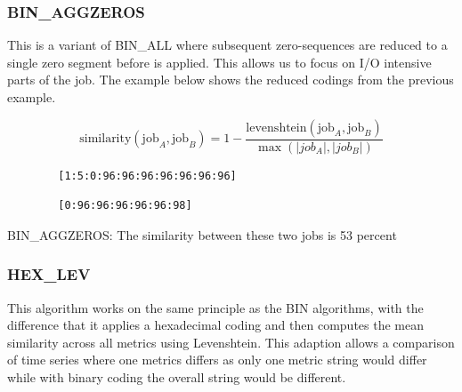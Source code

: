 \documentclass{jhps}
\begin{document}
\subsubsection{BIN\_AGGZEROS}
This is a variant of BIN\_ALL where subsequent zero-sequences are reduced to a single zero segment before  is applied.
This allows us to focus on I/O intensive parts of the job.
The example below shows the reduced codings from the previous example.

\begin{equation}
	\text{similarity} \left(\text{job}_{A},\text{job}_{B} \right) =1- \frac{\text{levenshtein} \left(\text{job}_{A},\text{job}_{B} \right) }{\max \left( |job_{A}|,|job_{B}| \right) } \label{eq:sim:bin_aggzeros}
\end{equation}


\begin{listing}
	\noindent\begin{minipage}{0.49\textwidth}
		\begin{lstlisting}
		[1:5:0:96:96:96:96:96:96:96]
		\end{lstlisting}
		\vspace{-2em}
		\label{lst:sim:bin_aggzeros:job_a}
	\end{minipage}
	\noindent\begin{minipage}{0.49\textwidth}
		\begin{lstlisting}
		[0:96:96:96:96:96:98]
		\end{lstlisting}
		\vspace{-2em}
		\label{lst:sim:bin_aggzeros:job_b}
	\end{minipage}
	\caption{BIN\_AGGZEROS: The similarity between these two jobs is 53 percent}
	\label{lst:sim:bin_aggzeros}
\end{listing}

\subsubsection{HEX\_LEV}
This algorithm works on the same principle as the BIN algorithms, with the difference that it applies a hexadecimal coding and then computes the mean similarity across all metrics using Levenshtein.
This adaption allows a comparison of time series where one metrics differs as only one metric string would differ while with binary coding the overall string would be different.
\end{document}
